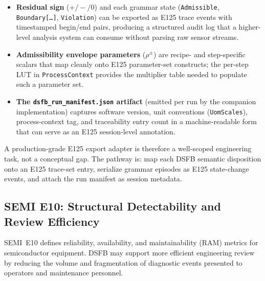 \documentclass[11pt,letterpaper]{article}
\theoremstyle{scresult}
\begin{document}
\begin{itemize}
  \item \textbf{Residual sign} ($+/-/0$) and each grammar state
        (\texttt{Admissible}, \texttt{Boundary[\ldots]}, \texttt{Violation}) can
        be exported as E125 trace events with timestamped begin/end pairs,
        producing a structured audit log that a higher-level analysis system can
        consume without parsing raw sensor streams.
  \item \textbf{Admissibility envelope parameters} ($\rho^{\pm}$) are recipe-
        and step-specific scalars that map cleanly onto E125 parameter-set
        constructs; the per-step LUT in \texttt{ProcessContext} provides the
        multiplier table needed to populate such a parameter set.
  \item \textbf{The \texttt{dsfb\_run\_manifest.json} artifact} (emitted per
        run by the companion implementation) captures software version, unit
        conventions (\texttt{UomScales}), process-context tag, and traceability
        entry count in a machine-readable form that can serve as an E125
        session-level annotation.
\end{itemize}

A production-grade E125 export adapter is therefore a well-scoped engineering
task, not a conceptual gap.  The pathway is: map each DSFB semantic disposition
onto an E125 trace-set entry, serialize grammar episodes as E125 state-change
events, and attach the run manifest as session metadata.

\subsection{SEMI E10: Structural Detectability and Review Efficiency}

SEMI~E10 defines reliability, availability, and maintainability (RAM) metrics
for semiconductor equipment. DSFB may support more efficient engineering review
by reducing the volume and fragmentation of diagnostic events presented to
operators and maintenance personnel.
\end{document}
